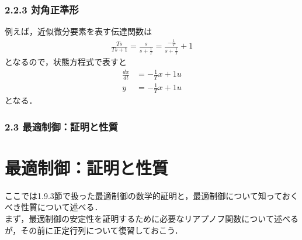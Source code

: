 \begin{frame}[t]
\frametitle{2.2.3 対角正準形}

例えば，近似微分要素を表す伝達関数は
\begin{align}
 \frac{Ts}{Ts+1} = \frac{s}{s+\frac{1}{T}}
 = \frac{-\frac{1}{T}}{s+\frac{1}{T}} + 1
\end{align}
となるので，状態方程式で表すと
\begin{align}
 \frac{dx}{dt} &= -\frac{1}{T} x + 1u \\
 y             &= -\frac{1}{T} x + 1u
\end{align}
となる．

\end{frame}

\begin{frame}[t]
\frametitle{2.3 最適制御：証明と性質}

\section{最適制御：証明と性質}

ここでは1.9.3節で扱った最適制御の数学的証明と，最適制御について知っておくべき性質について述べる．
\\[3mm]

まず，最適制御の安定性を証明するために必要なリアプノフ関数について述べるが，その前に正定行列について復習しておこう．

\end{frame}


